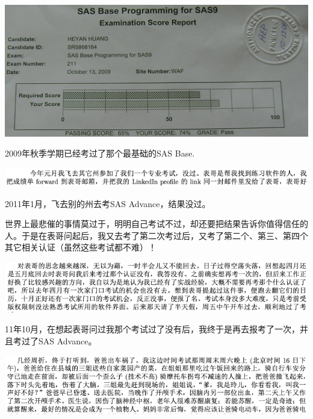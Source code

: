 \documentclass[9pt, b5paper]{article}
\begin{document}
\begin{center}
\includegraphics[width=.9\linewidth]{./pic/backups_plans_20210414_190557.png}
\end{center}

2009年秋季学期已经考过了那个最基础的SAS Base.

\begin{center}
\includegraphics[width=.9\linewidth]{./pic/backups_plans_20210414_164402.png}
\end{center}

2011年1月，飞去别的州去考SAS Advance，结果没过。

世界上最悲催的事情莫过于，明明自己考试不过，却还要把结果告诉你值得信任的人。于是在表哥问起后，我又去考了第二次考过后，又考了第二个、第三、第四个其它相关认证（虽然这些考试都不难）！

\begin{center}
\includegraphics[width=.9\linewidth]{./pic/backups_plans_20210414_165509.png}
\end{center}

11年10月，在想起表哥问过我那个考试过了没有后，我终于是再去报考了一次，并且考过了SAS Advance。 

\begin{center}
\includegraphics[width=.9\linewidth]{./pic/backups_plans_20210414_193202.png}
\end{center}
\end{document}
